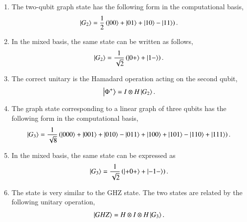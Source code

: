 \begin{solution}
\begin{enumerate}[label=(\alph*)]
    \item The two-qubit graph state has the following form in the computational basis,
    \begin{equation*}
        \left| G_2 \right\rangle = \frac{1}{2} \left( \left| 00 \right\rangle + \left| 01 \right\rangle + \left| 10 \right\rangle - \left| 11 \right\rangle \right).
    \end{equation*}
    \item In the mixed basis, the same state can be written as follows,
    \begin{equation*}
        \left| G_2 \right\rangle = \frac{1}{\sqrt{2}} \left( \left| 0+ \right\rangle + \left| 1- \right\rangle \right).
    \end{equation*}
    \item The correct unitary is the Hamadard operation acting on the second qubit,
    \begin{equation*}
        \left| \Phi^+ \right\rangle = I \otimes H \left| G_2 \right\rangle.
    \end{equation*}
    \item The graph state corresponding to a linear graph of three qubits has the following form in the computational basis,
    \begin{equation*}
        \left| G_3 \right\rangle = \frac{1}{\sqrt{8}} \left( \left| 000 \right\rangle + \left| 001 \right\rangle + \left| 010 \right\rangle - \left| 011 \right\rangle + \left| 100 \right\rangle + \left| 101 \right\rangle - \left| 110 \right\rangle + \left| 111 \right\rangle \right).
    \end{equation*}
    \item In the mixed basis, the same state can be expressed as
    \begin{equation*}
        \left| G_3 \right\rangle = \frac{1}{\sqrt{2}} \left( \left| +0+ \right\rangle + \left| -1- \right\rangle \right).
    \end{equation*}
    \item The state  is very similar to the GHZ state. The two states are related by the following unitary operation,
    \begin{equation*}
        \left| GHZ \right\rangle = H \otimes I \otimes H \left| G_3 \right\rangle.
    \end{equation*}
\end{enumerate}
\end{solution}

\newpage
\printsolutions[chapter={14}]